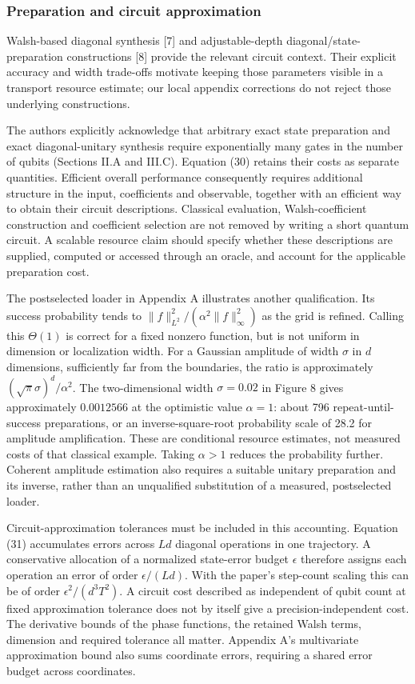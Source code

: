 \subsubsection{Preparation and circuit
approximation}\label{preparation-and-circuit-approximation}

Walsh-based diagonal synthesis {[}7{]} and adjustable-depth
diagonal/state-preparation constructions {[}8{]} provide the relevant
circuit context. Their explicit accuracy and width trade-offs motivate
keeping those parameters visible in a transport resource estimate; our
local appendix corrections do not reject those underlying constructions.

The authors explicitly acknowledge that arbitrary exact state
preparation and exact diagonal-unitary synthesis require exponentially
many gates in the number of qubits (Sections II.A and III.C). Equation
(30) retains their costs as separate quantities. Efficient overall
performance consequently requires additional structure in the input,
coefficients and observable, together with an efficient way to obtain
their circuit descriptions. Classical evaluation, Walsh-coefficient
construction and coefficient selection are not removed by writing a
short quantum circuit. A scalable resource claim should specify whether
these descriptions are supplied, computed or accessed through an oracle,
and account for the applicable preparation cost.

The postselected loader in Appendix A illustrates another qualification.
Its success probability tends to
\(\|f\|_{L^2}^2/(\alpha^2\|f\|_\infty^2)\) as the grid is refined.
Calling this \(\Theta(1)\) is correct for a fixed nonzero function, but
is not uniform in dimension or localization width. For a Gaussian
amplitude of width \(\sigma\) in \(d\) dimensions, sufficiently far from
the boundaries, the ratio is approximately
\((\sqrt{\pi}\sigma)^d/\alpha^2\). The two-dimensional width
\(\sigma=0.02\) in Figure 8 gives approximately \(0.0012566\) at the
optimistic value \(\alpha=1\): about 796 repeat-until-success
preparations, or an inverse-square-root probability scale of 28.2 for
amplitude amplification. These are conditional resource estimates, not
measured costs of that classical example. Taking \(\alpha>1\) reduces
the probability further. Coherent amplitude estimation also requires a
suitable unitary preparation and its inverse, rather than an unqualified
substitution of a measured, postselected loader.

Circuit-approximation tolerances must be included in this accounting.
Equation (31) accumulates errors across \(Ld\) diagonal operations in
one trajectory. A conservative allocation of a normalized state-error
budget \(\epsilon\) therefore assigns each operation an error of order
\(\epsilon/(Ld)\). With the paper's step-count scaling this can be of
order \(\epsilon^2/(d^3T^2)\). A circuit cost described as independent
of qubit count at fixed approximation tolerance does not by itself give
a precision-independent cost. The derivative bounds of the phase
functions, the retained Walsh terms, dimension and required tolerance
all matter. Appendix A's multivariate approximation bound also sums
coordinate errors, requiring a shared error budget across coordinates.

